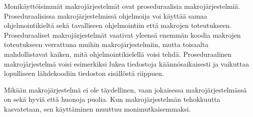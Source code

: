 Monikäyttöisimmät makrojärjestelmät ovat proseduraalisia makrojärjestelmiä.
Proseduraalisissa makrojärjestelmissä ohjelmoija voi käyttää samaa
ohjelmointikieltä sekä tavalliseen ohjelmointiin että makrojen toteutukseen.
Proseduraaliset makrojärjestelmät vaativat yleensä enemmän koodia makrojen
toteutukseen verrattuna muihin makrojärjestelmiin, mutta toisaalta
mahdollistavat kaiken, mitä ohjelmointikielellä voisi tehdä. Proseduraalinen
makrojärjestelmä voisi esimerkiksi lukea tiedostoja käännösaikaisesti ja
vaikuttaa lopulliseen lähdekoodiin tiedoston sisällöstä riippuen.

Mikään makrojärjestelmä ei ole täydellinen, vaan jokaisessa makrojärjestelmässä
on sekä hyviä että huonoja puolia. Kun makrojärjestelmän tehokkuutta
kasvatetaan, sen käyttäminen muuttuu monimutkaisemmaksi.

%
%
%
%
%
%
%
%
%

%

%
